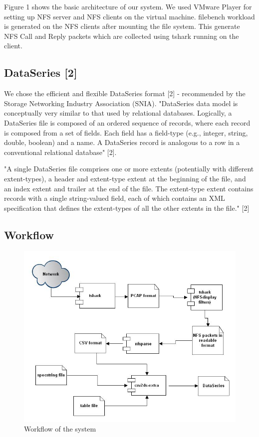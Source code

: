 \documentclass[conference]{IEEEtran}
\begin{document}
Figure 1 shows the basic architecture of our system. We used VMware Player for setting up NFS server and NFS clients on the virtual machine. filebench workload is generated on the NFS clients after mounting the file system. This generate NFS Call and Reply packets which are collected using tshark running on the client.

\subsection{DataSeries [2]}
We chose the efficient and flexible DataSeries format [2]  - recommended by the Storage Networking Industry Association (SNIA). "DataSeries data model is conceptually very similar to that used by relational databases. Logically, a DataSeries file is composed of an ordered sequence of records, where each record is composed from a set of fields. Each field has a field-type (e.g., integer, string, double, boolean) and a name. A DataSeries record is analogous to a row in a conventional relational database" [2]. 

"A single DataSeries file comprises one or more extents (potentially with different extent-types), a header and extent-type extent at the beginning of the file, and an index extent and trailer at the end of the file. The extent-type extent contains records with a single string-valued field, each of which contains an XML specification that defines the extent-types of all the other extents in the file." [2]

\subsection{Workflow}

\begin{figure}[htb]
\centering
\includegraphics[width=\linewidth]{Flow.jpg}
\caption{Workflow of the system}
\label{fig:awesome_image}
\end{figure}
\end{document}

